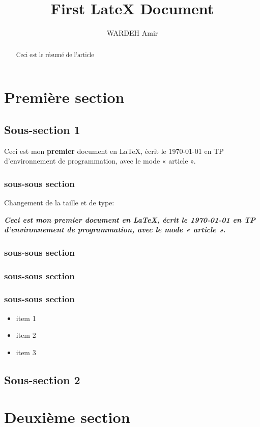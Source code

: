 \documentclass{article}
\title{First LateX Document}
\author{WARDEH Amir}
\begin{document}
\maketitle

\begin{abstract}
Ceci est le résumé de l'article
\end{abstract}

\section{Première section}
\subsection{Sous-section 1}
Ceci est mon \textbf{premier} document en \LaTeX,
écrit le \today{} en TP d’environnement de programmation,
avec le mode « article ».
\subsubsection{sous-sous section}
Changement de la taille et de type:

{\textbf{\emph{\large Ceci est mon \textbf{premier} document en \LaTeX,
écrit le \today{} en TP d’environnement de programmation,
avec le mode « article ».}}}
\subsubsection {sous-sous section}
\subsubsection{sous-sous section}
\subsubsection{sous-sous section}

\begin{itemize}
\item item 1
\item item 2
\item item 3
\end{itemize}


\subsection{Sous-section 2}
\section{Deuxième section}
\end{document}
